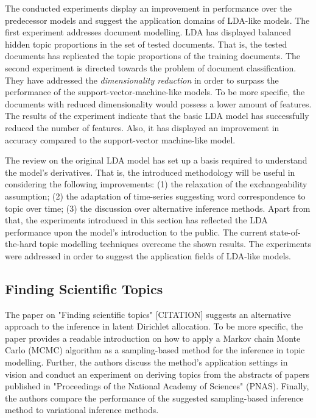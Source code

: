 \documentclass{mprop}
\begin{document}
\par The conducted experiments display an improvement in performance over the predecessor models and suggest the application domains of LDA-like models. The first experiment addresses document modelling. LDA  has displayed balanced hidden topic proportions in the set of tested documents. That is, the tested documents has replicated the topic proportions of the training documents. The second experiment is directed towards the problem of document classification. They have addressed the \textit{dimensionality reduction} in order to surpass the performance of the support-vector-machine-like models. To be more specific, the documents with reduced dimensionality would possess a lower amount of features. The results of the experiment indicate that the basic LDA model has successfully reduced the number of features. Also, it has displayed an improvement in accuracy compared to the support-vector machine-like model. 

\par The review on the original LDA model has set up a basis required to understand the model's derivatives. That is, the introduced methodology will be useful in considering the following improvements: (1) the  relaxation of the exchangeability assumption; (2) the adaptation of time-series suggesting word correspondence to topic over time; (3) the discussion over alternative inference methods. Apart from that, the experiments introduced in this section has reflected the LDA performance upon the model's introduction to the public. The current state-of-the-hard topic modelling techniques overcome the shown results. The experiments were addressed in order to suggest the application fields of LDA-like models.

\subsection{Finding Scientific Topics}

\par The paper on "Finding scientific topics" [CITATION] suggests an alternative approach to the inference in latent Dirichlet allocation. To be more specific, the paper provides a readable introduction on how to apply a Markov chain Monte Carlo (MCMC) algorithm as a sampling-based method for the inference in topic modelling. Further, the authors discuss the method's application settings in vision and conduct an experiment on deriving topics from the abstracts of papers published in "Proceedings of the National Academy of Sciences" (PNAS). Finally, the authors compare the performance of the suggested sampling-based inference method to variational inference methods. 
\end{document}
